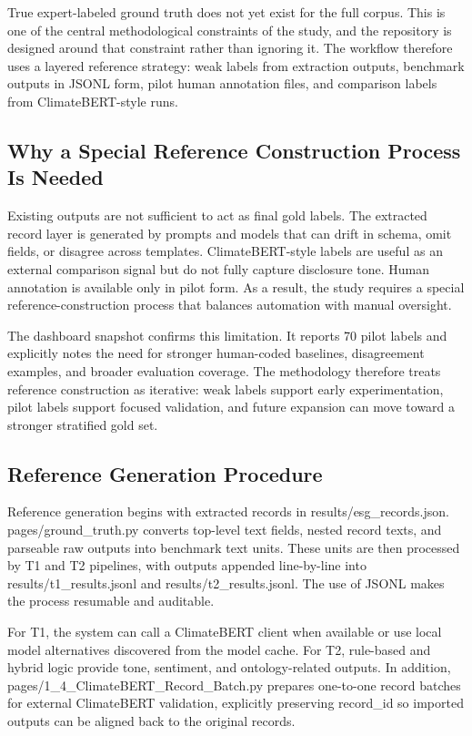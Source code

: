 True expert-labeled ground truth does not yet exist for the full corpus. This is one of the central methodological constraints of the study, and the repository is designed around that constraint rather than ignoring it. The workflow therefore uses a layered reference strategy: weak labels from extraction outputs, benchmark outputs in JSONL form, pilot human annotation files, and comparison labels from ClimateBERT-style runs.

\subsection{Why a Special Reference Construction Process Is Needed}

Existing outputs are not sufficient to act as final gold labels. The extracted record layer is generated by prompts and models that can drift in schema, omit fields, or disagree across templates. ClimateBERT-style labels are useful as an external comparison signal but do not fully capture disclosure tone. Human annotation is available only in pilot form. As a result, the study requires a special reference-construction process that balances automation with manual oversight.

The dashboard snapshot confirms this limitation. It reports 70 pilot labels and explicitly notes the need for stronger human-coded baselines, disagreement examples, and broader evaluation coverage. The methodology therefore treats reference construction as iterative: weak labels support early experimentation, pilot labels support focused validation, and future expansion can move toward a stronger stratified gold set.

\subsection{Reference Generation Procedure}

Reference generation begins with extracted records in results/esg\_records.json. pages/ground\_truth.py converts top-level text fields, nested record texts, and parseable raw outputs into benchmark text units. These units are then processed by T1 and T2 pipelines, with outputs appended line-by-line into results/t1\_results.jsonl and results/t2\_results.jsonl. The use of JSONL makes the process resumable and auditable.

For T1, the system can call a ClimateBERT client when available or use local model alternatives discovered from the model cache. For T2, rule-based and hybrid logic provide tone, sentiment, and ontology-related outputs. In addition, pages/1\_4\_ClimateBERT\_Record\_Batch.py prepares one-to-one record batches for external ClimateBERT validation, explicitly preserving record\_id so imported outputs can be aligned back to the original records.

